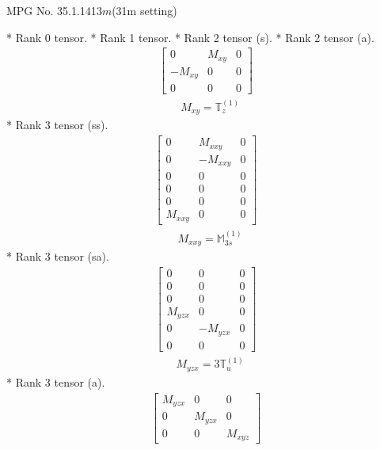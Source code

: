 \documentclass[fleqn,8pt,landscape]{jsarticle}
\begin{document}
\setcounter{MaxMatrixCols}{32}

\renewcommand{\tablename}{Table~}
\renewcommand{\figurename}{Figure~}
\begin{center}
\LARGE
MPG No. 35.1.141\quad$3m$\quad(31m setting)
\end{center}
* Rank 0 tensor.
* Rank 1 tensor.
* Rank 2 tensor (s).
* Rank 2 tensor (a).
\begin{align*}
\begin{bmatrix} 0 & M_{xy} & 0 \\ - M_{xy} & 0 & 0 \\ 0 & 0 & 0 \end{bmatrix}
\end{align*}
\begin{align*}
& M_{xy} = \mathbb{T}_{z}^{(1)}
\end{align*}
* Rank 3 tensor (ss).
\begin{align*}
\begin{bmatrix} 0 & M_{xxy} & 0 \\ 0 & - M_{xxy} & 0 \\ 0 & 0 & 0 \\ 0 & 0 & 0 \\ 0 & 0 & 0 \\ M_{xxy} & 0 & 0 \end{bmatrix}
\end{align*}
\begin{align*}
& M_{xxy} = \mathbb{M}_{3s}^{(1)}
\end{align*}
* Rank 3 tensor (sa).
\begin{align*}
\begin{bmatrix} 0 & 0 & 0 \\ 0 & 0 & 0 \\ 0 & 0 & 0 \\ M_{yzx} & 0 & 0 \\ 0 & - M_{yzx} & 0 \\ 0 & 0 & 0 \end{bmatrix}
\end{align*}
\begin{align*}
& M_{yzx} = 3 \mathbb{T}_{u}^{(1)}
\end{align*}
* Rank 3 tensor (a).
\begin{align*}
\begin{bmatrix} M_{yzx} & 0 & 0 \\ 0 & M_{yzx} & 0 \\ 0 & 0 & M_{xyz} \end{bmatrix}
\end{align*}
\end{document}

